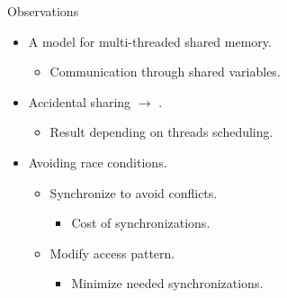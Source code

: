 \begin{frame}[t]{Observations}
\begin{itemize}
  \item A model for multi-threaded shared memory.
    \begin{itemize}
      \item Communication through shared variables.
    \end{itemize}

  \item Accidental sharing $\rightarrow$ .
    \begin{itemize}
      \item Result depending on threads scheduling.
    \end{itemize}

  \item Avoiding race conditions.
    \begin{itemize}
      \item Synchronize to avoid conflicts.
        \begin{itemize}
          \item Cost of synchronizations.
        \end{itemize}
      \item Modify access pattern.
        \begin{itemize}
          \item Minimize needed synchronizations.
        \end{itemize}
    \end{itemize}

\end{itemize}
\end{frame}
